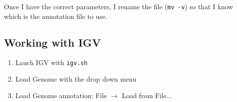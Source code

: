Once I have the correct parameters, I rename the file (\texttt{mv -v}) so that I know which is the annotation file to use.

\subsection{Working with IGV}
\begin{enumerate}
\item Lauch IGV with \texttt{igv.sh}
\item Load Genome with the drop down menu
  \begin{figure}[ht]
    \centering
  \end{figure}
  \pagebreak
\item Load Genome annotation: File $\rightarrow$ Load from File...
  \begin{figure}[ht]
    \centering
\end{figure}
\end{enumerate}
